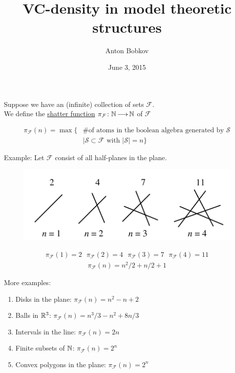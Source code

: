 \documentclass{beamer}
\title{VC-density in model theoretic structures}
\author{Anton Bobkov}
\date{June 3, 2015}
\newcommand{\F}{\mathcal F}
\newcommand{\defn}{\underline}
\begin{document}
\maketitle

\begin{frame}
  Suppose we have an (infinite) collection of sets $\F$. \\
  We define the \defn{shatter function} $\pi_\F \colon \N \arr \N$ of $\F$

  \begin{align*}
    \pi_\F(n) = \max \{ &\text {\# of atoms in the boolean algebra generated by $\mathcal S$} \\
    &\mid \mathcal S \subset \F \text{ with } |\mathcal S| = n\}
  \end{align*}
\end{frame}

\begin{frame}
  Example: Let $\F$ consist of all half-planes in the plane.
  \begin{figure}[p]
    \centering
    \includegraphics[scale=0.75]{lines.png}
  \end{figure}
  \begin{align*}
    \pi_\F(1) = 2 \ \ \  \pi_\F(2) = 4 \ \ \  \pi_\F(3) = 7  \ \ \ \pi_\F(4) = 11
  \end{align*}
  \begin{align*}
    \pi_\F(n) = n^2/2 + n/2 + 1
  \end{align*}
\end{frame}

\begin{frame}
  More examples: \\
  \begin{enumerate}
  \item Disks in the plane:	$\pi_\F(n) = n^2 - n + 2$
  \item Balls in $\mathbb{R}^3$: $\pi_\F(n) = n^3/3 - n^2 + 8n/3$
  \item Intervals in the line: $\pi_\F(n) = 2n$
  \item Finite subsets of $\mathbb{N}$: $\pi_\F(n) = 2^n$
  \item Convex polygons in the plane: $\pi_\F(n) = 2^n$
  \end{enumerate}
\end{frame}
\end{document}
